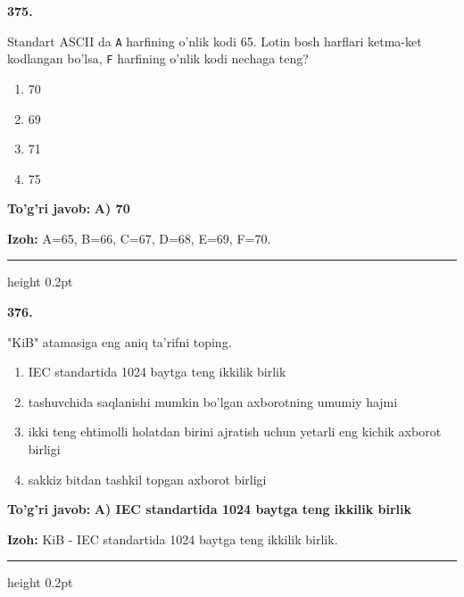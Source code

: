 \documentclass[10pt,a4paper,oneside]{article}
\begin{document}
\noindent\textbf{\color{ink}375.}
\par
Standart ASCII da \texttt{A} harfining o'nlik kodi 65. Lotin bosh harflari ketma-ket kodlangan bo'lsa, \texttt{F} harfining o'nlik kodi nechaga teng?
\begin{enumerate}[label=\Alph*),leftmargin=9mm]
\item 70
\item 69
\item 71
\item 75
\end{enumerate}
\begin{tcolorbox}[enhanced,breakable,colback=teal!4,colframe=teal!50!black,boxrule=0.5pt,arc=1.1mm,left=3mm,right=3mm,top=1.7mm,bottom=1.7mm,before skip=2mm,after skip=2mm]
\textbf{\color{teal}To'g'ri javob:} \textbf{A) 70}
\par\smallskip
\textbf{Izoh:} A=65, B=66, C=67, D=68, E=69, F=70.
\end{tcolorbox}
\vspace{2mm}\hrule height 0.2pt \vspace{3mm}

\noindent\textbf{\color{ink}376.}
\par
"KiB" atamasiga eng aniq ta'rifni toping.
\begin{enumerate}[label=\Alph*),leftmargin=9mm]
\item IEC standartida 1024 baytga teng ikkilik birlik
\item tashuvchida saqlanishi mumkin bo'lgan axborotning umumiy hajmi
\item ikki teng ehtimolli holatdan birini ajratish uchun yetarli eng kichik axborot birligi
\item sakkiz bitdan tashkil topgan axborot birligi
\end{enumerate}
\begin{tcolorbox}[enhanced,breakable,colback=teal!4,colframe=teal!50!black,boxrule=0.5pt,arc=1.1mm,left=3mm,right=3mm,top=1.7mm,bottom=1.7mm,before skip=2mm,after skip=2mm]
\textbf{\color{teal}To'g'ri javob:} \textbf{A) IEC standartida 1024 baytga teng ikkilik birlik}
\par\smallskip
\textbf{Izoh:} KiB - IEC standartida 1024 baytga teng ikkilik birlik.
\end{tcolorbox}
\vspace{2mm}\hrule height 0.2pt \vspace{3mm}
\end{document}
